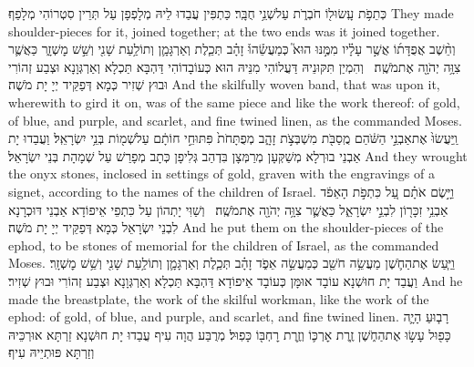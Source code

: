 {כְּתֵפֹ֥ת עָֽשׂוּ\maqqaf ל֖וֹ חֹבְרֹ֑ת עַל\maqqaf שְׁנֵ֥י  חֻבָּֽר׃}
{כַּתְפִּין עֲבַדוּ לֵיהּ מְלָפְפָן עַל תְּרֵין סִטְרוֹהִי מְלָפַף׃}
{They made shoulder-pieces for it, joined together; at the two ends was it joined together.}{}
{וְחֵ֨שֶׁב אֲפֻדָּת֜וֹ אֲשֶׁ֣ר עָלָ֗יו מִמֶּ֣נּוּ הוּא֮ כְּמַעֲשֵׂ֒הוּ֒ זָהָ֗ב תְּכֵ֧לֶת וְאַרְגָּמָ֛ן וְתוֹלַ֥עַת שָׁנִ֖י וְשֵׁ֣שׁ מׇשְׁזָ֑ר כַּאֲשֶׁ֛ר צִוָּ֥ה יְהֹוָ֖ה אֶת\maqqaf מֹשֶֽׁה׃ \setuma }
{וְהִמְיַן תִּקּוּנֵיהּ דַּעֲלוֹהִי מִנֵּיהּ הוּא כְּעוֹבָדוֹהִי דַּהְבָּא תַּכְלָא וְאַרְגְּוָנָא וּצְבַע זְהוֹרִי וּבוּץ שְׁזִיר כְּמָא דְּפַקֵּיד יְיָ יָת מֹשֶׁה׃}
{And the skilfully woven band, that was upon it, wherewith to gird it on, was of the same piece and like the work thereof: of gold, of blue, and purple, and scarlet, and fine twined linen, as the \lord\space commanded Moses.}{}
{וַֽיַּעֲשׂוּ֙ אֶת\maqqaf אַבְנֵ֣י הַשֹּׁ֔הַם מֻֽסַבֹּ֖ת מִשְׁבְּצֹ֣ת זָהָ֑ב מְפֻתָּחֹת֙ פִּתּוּחֵ֣י חוֹתָ֔ם עַל\maqqaf שְׁמ֖וֹת בְּנֵ֥י יִשְׂרָאֵֽל׃}
{וַעֲבַדוּ יָת אַבְנֵי בוּרְלָא מְשַׁקְּעָן מְרַמְּצָן בִּדְהַב גְּלִיפָן כְּתָב מְפָרַשׁ עַל שְׁמָהָת בְּנֵי יִשְׂרָאֵל׃}
{And they wrought the onyx stones, inclosed in settings of gold, graven with the engravings of a signet, according to the names of the children of Israel.}{}
{וַיָּ֣שֶׂם אֹתָ֗ם עַ֚ל כִּתְפֹ֣ת הָאֵפֹ֔ד אַבְנֵ֥י זִכָּר֖וֹן לִבְנֵ֣י יִשְׂרָאֵ֑ל כַּאֲשֶׁ֛ר צִוָּ֥ה יְהֹוָ֖ה אֶת\maqqaf מֹשֶֽׁה׃ \petucha }
{וְשַׁוִּי יָתְהוֹן עַל כִּתְפֵי אֵיפוֹדָא אַבְנֵי דּוּכְרָנָא לִבְנֵי יִשְׂרָאֵל כְּמָא דְּפַקֵּיד יְיָ יָת מֹשֶׁה׃}
{And he put them on the shoulder-pieces of the ephod, to be stones of memorial for the children of Israel, as the \lord\space commanded Moses.}{}
{וַיַּ֧עַשׂ אֶת\maqqaf הַחֹ֛שֶׁן מַעֲשֵׂ֥ה חֹשֵׁ֖ב כְּמַעֲשֵׂ֣ה אֵפֹ֑ד זָהָ֗ב תְּכֵ֧לֶת וְאַרְגָּמָ֛ן וְתוֹלַ֥עַת שָׁנִ֖י וְשֵׁ֥שׁ מׇשְׁזָֽר׃}
{וַעֲבַד יָת חוּשְׁנָא עוֹבָד אוּמָּן כְּעוֹבָד אֵיפוֹדָא דַּהְבָּא תַּכְלָא וְאַרְגְּוָנָא וּצְבַע זְהוֹרִי וּבוּץ שְׁזִיר׃}
{And he made the breastplate, the work of the skilful workman, like the work of the ephod: of gold, of blue, and purple, and scarlet, and fine twined linen.}{}
{רָב֧וּעַ הָיָ֛ה כָּפ֖וּל עָשׂ֣וּ אֶת\maqqaf הַחֹ֑שֶׁן זֶ֧רֶת אׇרְכּ֛וֹ וְזֶ֥רֶת רׇחְבּ֖וֹ כָּפֽוּל׃}
{מְרֻבַּע הֲוָה עִיף עֲבַדוּ יָת חוּשְׁנָא זַרְתָּא אוּרְכֵּיהּ וְזַרְתָּא פּוּתְיֵיהּ עִיף׃}
